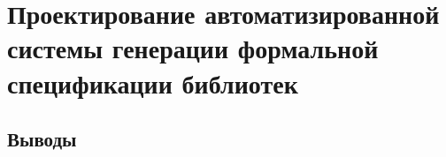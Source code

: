 \chapter{Проектирование автоматизированной системы генерации формальной спецификации библиотек}

\blindtext

\section{Выводы}
